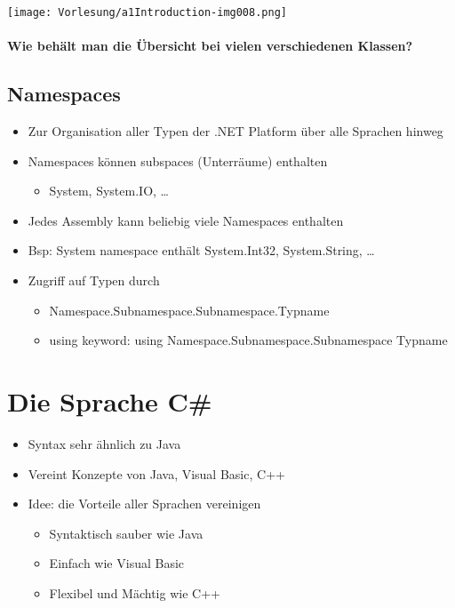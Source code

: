\begin{center}
\texttt{[image: Vorlesung/a1Introduction-img008.png]}
\end{center} 


\paragraph{Wie behält man die Übersicht bei vielen verschiedenen Klassen?}

\subsection{Namespaces}
\begin{itemize}
\item Zur Organisation aller Typen der .NET Platform über alle Sprachen hinweg
\item Namespaces können subspaces (Unterräume) enthalten
\begin{itemize}
\item System, System.IO, … 
\end{itemize}
\item Jedes Assembly kann beliebig viele Namespaces enthalten 
\item Bsp: System namespace enthält System.Int32, System.String, …
\item Zugriff auf Typen durch
\begin{itemize}
\item Namespace.Subnamespace.Subnamespace.Typname
\item using keyword: using Namespace.Subnamespace.Subnamespace Typname 
\end{itemize}
\end{itemize}

\section{Die Sprache C\#}
\begin{itemize}
\item Syntax sehr ähnlich zu Java
\item Vereint Konzepte von Java, Visual Basic, C++
\item Idee: die Vorteile aller Sprachen vereinigen
\begin{itemize}
\item Syntaktisch sauber wie Java
\item Einfach wie Visual Basic
\item Flexibel und Mächtig wie C++
\end{itemize}
\end{itemize}

